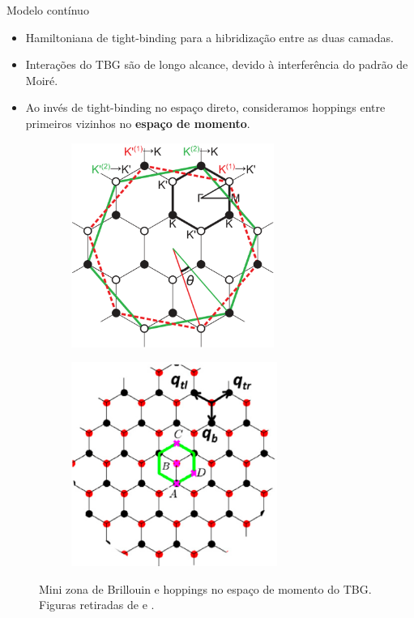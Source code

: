 \documentclass[8pt,aspectratio=169,xcolor={table,dvipsnames,usenames}]{beamer}
\begin{document}

\begin{frame}{Modelo contínuo}

\begin{itemize}
\item Hamiltoniana de tight-binding para a hibridização entre as duas camadas.
\item Interações do TBG são de longo alcance, devido à interferência do padrão de Moiré.
\item Ao invés de tight-binding no espaço direto, consideramos hoppings entre primeiros vizinhos no \textbf{espaço de momento}.
\end{itemize}

\begin{figure}[H]
\centering
\begin{subfigure}{.48\textwidth}
  \centering
  \includegraphics[height=18em]{fig/minibz.png}
  \label{fig:minibz}
\end{subfigure}%
\quad
\begin{subfigure}{.48\textwidth}
  \centering
  \includegraphics[height=18em]{fig/tightbinding-q.png}
  \label{fig:tightbinding-q}
\end{subfigure}
\caption{Mini zona de Brillouin e hoppings no espaço de momento do TBG. Figuras retiradas de \cite{koshino} e \cite{macdonald}.}
\label{fig:tbg-bz}
\end{figure}

\end{frame}
\end{document}
